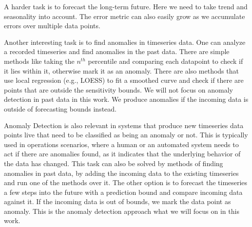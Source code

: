 A harder task is to forecast the long-term future. Here we need to take trend and seasonality into account. The error metric can also easily grow as we accumulate errors over multiple data points.

Another interesting task is to find anomalies in timeseries data. One can analyze a recorded timeseries and find anomalies in the past data. There are simple methods like taking the \(n^{th}\) percentile and comparing each datapoint to check if it lies within it, otherwise mark it as an anomaly. There are also methods that use local regression (e.g., LOESS) to fit a smoothed curve and check if there are points that are outside the sensitivity bounds. We will not focus on anomaly detection in past data in this work. We produce anomalies if the incoming data is outside of forecasting bounds instead.

Anomaly Detection is also relevant in systems that produce new timeseries data points live that need to be classified as being an anomaly or not. This is typically used in operations scenarios, where a human or an automated system needs to act if there are anomalies found, as it indicates that the underlying behavior of the data has changed. This task can also be solved by methods of finding anomalies in past data, by adding the incoming data to the existing timeseries and run one of the methods over it. The other option is to forecast the timeseries a few steps into the future with a prediction bound and compare incoming data against it. If the incoming data is out of bounds, we mark the data point as anomaly. This is the anomaly detection approach what we will focus on in this work.
